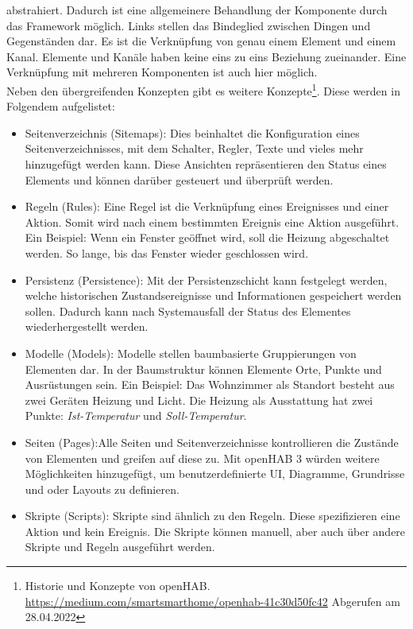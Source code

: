     abstrahiert. Dadurch ist eine allgemeinere Behandlung der Komponente durch das Framework möglich. Links stellen das Bindeglied 
    zwischen Dingen und Gegenständen dar. Es ist die Verknüpfung von genau einem Element und einem Kanal. Elemente und 
    Kanäle haben keine eins zu eins Beziehung zueinander. Eine Verknüpfung mit mehreren Komponenten ist auch hier möglich. 
    \\
    \linebreak
    Neben den übergreifenden Konzepten gibt es weitere Konzepte\footnote{Historie und Konzepte von openHAB. \url{https://medium.com/smartsmarthome/openhab-41c30d50fc42} Abgerufen am 28.04.2022}. 
    Diese werden in Folgendem aufgelistet:
    \begin{itemize}
        \item Seitenverzeichnis (Sitemaps): Dies beinhaltet die Konfiguration eines Seitenverzeichnisses, mit dem Schalter, 
        Regler, Texte und vieles mehr hinzugefügt werden kann. Diese Ansichten repräsentieren den Status eines Elements und 
        können darüber gesteuert und überprüft werden.
        \item Regeln (Rules): Eine Regel ist die Verknüpfung eines Ereignisses und einer Aktion. Somit wird nach einem bestimmten 
        Ereignis eine Aktion ausgeführt. Ein Beispiel: Wenn ein Fenster geöffnet wird, soll die Heizung abgeschaltet werden. 
        So lange, bis das Fenster wieder geschlossen wird. 
        \item Persistenz (Persistence): Mit der Persistenzschicht kann festgelegt werden, welche historischen Zustandsereignisse 
        und Informationen gespeichert werden sollen. Dadurch kann nach Systemausfall der Status des Elementes wiederhergestellt werden. 
        \item Modelle (Models): Modelle stellen baumbasierte Gruppierungen von Elementen dar. In der Baumstruktur können Elemente 
        Orte, Punkte und Ausrüstungen sein. Ein Beispiel: Das Wohnzimmer als Standort besteht aus zwei Geräten Heizung und Licht. 
        Die Heizung als Ausstattung hat zwei Punkte: \textit{Ist-Temperatur} und \textit{Soll-Temperatur}.
        \item Seiten (Pages):Alle Seiten und Seitenverzeichnisse kontrollieren die Zustände von Elementen und greifen auf diese zu. 
        Mit openHAB 3 würden weitere Möglichkeiten hinzugefügt, um benutzerdefinierte \acs{UI}, Diagramme, Grundrisse und oder 
        Layouts zu definieren. 
        \item Skripte (Scripts): Skripte sind ähnlich zu den Regeln. Diese spezifizieren eine Aktion und kein Ereignis. Die Skripte 
        können manuell, aber auch über andere Skripte und Regeln ausgeführt werden. 
    \end{itemize}
